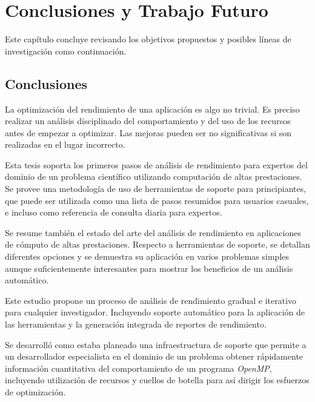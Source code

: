 \documentclass[a4paper]{report}
\begin{document}
\chapter{Conclusiones y Trabajo Futuro} \label{Conclusiones y Trabajo Futuro}

Este capítulo concluye revisando los objetivos propuestos y posibles líneas de investigación como continuación.

\section{Conclusiones}

La optimización del rendimiento de una aplicación es algo no trivial.
Es preciso realizar un análisis disciplinado del comportamiento y del uso de los recursos antes de
empezar a optimizar. Las mejoras pueden ser no significativas si son realizadas en el lugar incorrecto.

\bigskip

Esta tesis soporta los primeros pasos de análisis de rendimiento para expertos del dominio de un problema científico utilizando computación de altas prestaciones. Se provee una metodología de uso de herramientas de soporte para principiantes, que puede ser utilizada como una lista de pasos resumidos para usuarios casuales, e incluso como referencia de consulta diaria para expertos.

\bigskip

Se resume también el estado del arte del análisis de rendimiento en aplicaciones de cómputo de altas prestaciones. Respecto a herramientas de soporte, se detallan diferentes opciones y se demuestra su aplicación en varios problemas simples aunque suficientemente interesantes para mostrar los beneficios de un análisis automático. 

\bigskip

Este estudio propone un proceso de análisis de rendimiento gradual e iterativo para cualquier investigador. 
Incluyendo soporte automático para la aplicación de las herramientas y la generación integrada de
reportes de rendimiento.

\bigskip

Se desarrolló como estaba planeado una infraestructura de soporte que permite a un desarrollador especialista en el dominio de un problema obtener rápidamente información cuantitativa del comportamiento de un programa {\it OpenMP}, incluyendo utilización de recursos y cuellos de botella para así dirigir los esfuerzos de optimización.
\end{document}
